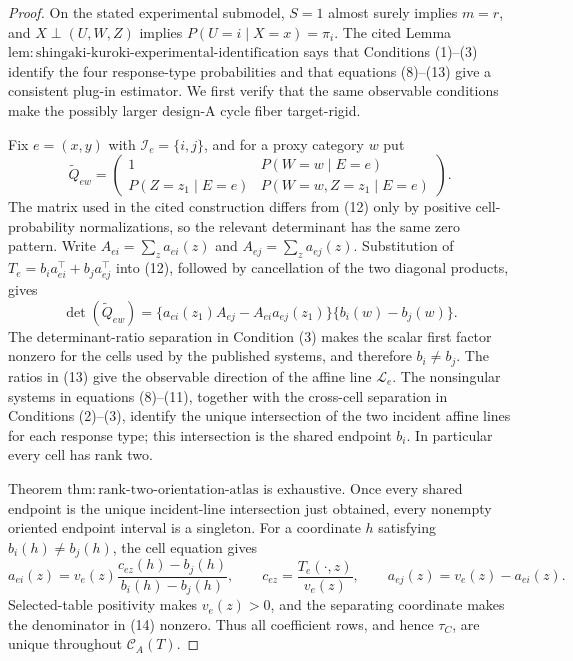 \documentclass{article}
\begin{document}
\begin{proof}
On the stated experimental submodel, \(S=1\) almost surely implies \(m=r\), and \(X\perp(U,W,Z)\) implies \(P(U=i\mid X=x)=\pi_i\).  The cited Lemma \(\mathrm{lem{:}shingaki\text{-}kuroki\text{-}experimental\text{-}identification}\) says that Conditions (1)--(3) identify the four response-type probabilities and that equations (8)--(13) give a consistent plug-in estimator.  We first verify that the same observable conditions make the possibly larger design-A cycle fiber target-rigid.

Fix \(e=(x,y)\) with \(\mathcal I_e=\{i,j\}\), and for a proxy category \(w\) put
\[
 \widetilde Q_{ew}=
 \begin{pmatrix}
  1&P(W=w\mid E=e)\\
  P(Z=z_1\mid E=e)&P(W=w,Z=z_1\mid E=e)
 \end{pmatrix}.                                            \tag{12}
\]
The matrix used in the cited construction differs from (12) only by positive cell-probability normalizations, so the relevant determinant has the same zero pattern.  Write
\(A_{ei}=\sum_z a_{ei}(z)\) and \(A_{ej}=\sum_z a_{ej}(z)\).  Substitution of
\(T_e=b_i a_{ei}^{\top}+b_j a_{ej}^{\top}\) into (12), followed by cancellation of the two diagonal products, gives
\[
 \det(\widetilde Q_{ew})
 =\{a_{ei}(z_1)A_{ej}-A_{ei}a_{ej}(z_1)\}
   \{b_i(w)-b_j(w)\}.                                     \tag{13}
\]
The determinant-ratio separation in Condition (3) makes the scalar first factor nonzero for the cells used by the published systems, and therefore \(b_i\ne b_j\).  The ratios in (13) give the observable direction of the affine line \(\mathcal L_e\).  The nonsingular systems in equations (8)--(11), together with the cross-cell separation in Conditions (2)--(3), identify the unique intersection of the two incident affine lines for each response type; this intersection is the shared endpoint \(b_i\).  In particular every cell has rank two.

Theorem \(\mathrm{thm{:}rank\text{-}two\text{-}orientation\text{-}atlas}\) is exhaustive.  Once every shared endpoint is the unique incident-line intersection just obtained, every nonempty oriented endpoint interval is a singleton.  For a coordinate \(h\) satisfying \(b_i(h)\ne b_j(h)\), the cell equation gives
\[
 a_{ei}(z)
 =v_e(z)
   \frac{c_{ez}(h)-b_j(h)}{b_i(h)-b_j(h)},
 \qquad
 c_{ez}=\frac{T_e(\cdot,z)}{v_e(z)},
 \qquad
 a_{ej}(z)=v_e(z)-a_{ei}(z).                              \tag{14}
\]
Selected-table positivity makes \(v_e(z)>0\), and the separating coordinate makes the denominator in (14) nonzero.  Thus all coefficient rows, and hence \(\tau_C\), are unique throughout \(\mathcal C_A(T)\).


\end{proof}
\end{document}
